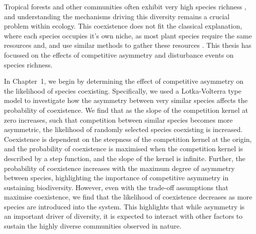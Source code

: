 Tropical forests and other communities often exhibit very high species richness \citep[e.g.][]{gentry1988tree,valencia1994high,walter1971ecology}, and understanding the mechanisms driving this diversity remains a crucial problem within ecology. This coexistence does not fit the classical explanation, where each species occupies it's own niche, as most plant species require the same resources and, and use similar methods to gather these resources \citep{silvertown2004plant}. This thesis has focussed on the effects of competitive asymmetry and disturbance events on species richness.

In Chapter~1, we begin by determining the effect of competitive asymmetry on the likelihood of species coexisting. Specifically, we used a Lotka-Volterra type model to investigate how the asymmetry between very similar species affects the probability of coexistence. We find that as the slope of the competition kernel at zero increases, such that competition between similar species becomes more asymmetric, the likelihood of randomly selected species coexisting is increased. Coexistence is dependent on the steepness of the competition kernel at the origin, and the probability of coexistence is maximised when the competition kernel is described by a step function, and the slope of the kernel is infinite. Further, the probability of coexistence increases with the maximum degree of asymmetry between species, highlighting the importance of competitive asymmetry in sustaining biodiversity. However, even with the trade-off assumptions that maximise coexistence, we find that the likelihood of coexistence decreases as more species are introduced into the system. This highlights that while asymmetry is an important driver of diversity, it is expected to interact with other factors to sustain the highly diverse communities observed in nature.

